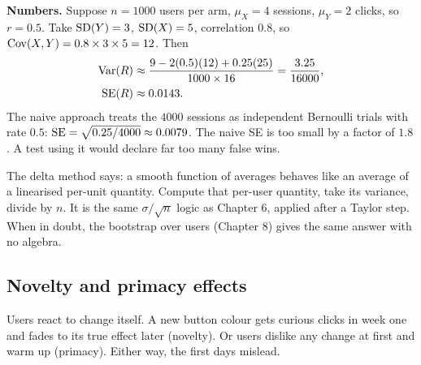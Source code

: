 \textbf{Numbers.} Suppose $n = 1000$ users per arm, $\mu_X = 4$ sessions,
$\mu_Y = 2$ clicks, so $r = 0.5$. Take $\operatorname{SD}(Y) = 3$, $\operatorname{SD}(X) = 5$, correlation
$0.8$, so $\operatorname{Cov}(X,Y) = 0.8 \times 3 \times 5 = 12$. Then
\begin{align*}
  \operatorname{Var}(R) &\approx \frac{9 - 2(0.5)(12) + 0.25(25)}{1000 \times 16}
  = \frac{3.25}{16000}, \\
  \operatorname{SE}(R) &\approx 0.0143.
\end{align*}
The naive approach treats the $4000$ sessions as independent Bernoulli trials
with rate $0.5$: $\operatorname{SE} = \sqrt{0.25/4000} \approx 0.0079$. The naive SE is
too small by a factor of $1.8$. A test using it would declare far too many
false wins.

\begin{intuitionbox}
The delta method says: a smooth function of averages behaves like an average
of a linearised per-unit quantity. Compute that per-user quantity, take its
variance, divide by $n$. It is the same $\sigma/\sqrt n$ logic as Chapter 6,
applied after a Taylor step. When in doubt, the bootstrap over users
(Chapter 8) gives the same answer with no algebra.
\end{intuitionbox}

\subsection{Novelty and primacy effects}

Users react to change itself. A new button colour gets curious clicks in week
one and fades to its true effect later (novelty). Or users dislike any change
at first and warm up (primacy). Either way, the first days mislead.

